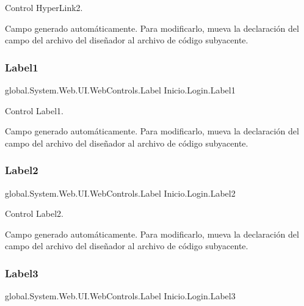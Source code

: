 Control Hyper\+Link2. 

Campo generado automáticamente. Para modificarlo, mueva la declaración del campo del archivo del diseñador al archivo de código subyacente. \mbox{\label{classInicio_1_1Login_a089c50220a66bcedf279557e235b7fb1}} 
\subsubsection{\texorpdfstring{Label1}{Label1}}
{\footnotesize\ttfamily global.\+System.\+Web.\+U\+I.\+Web\+Controls.\+Label Inicio.\+Login.\+Label1\hspace{0.3cm}{\ttfamily [protected]}}



Control Label1. 

Campo generado automáticamente. Para modificarlo, mueva la declaración del campo del archivo del diseñador al archivo de código subyacente. \mbox{\label{classInicio_1_1Login_a88ab7f12f1587cb3a0174d4bdc7baa39}} 
\subsubsection{\texorpdfstring{Label2}{Label2}}
{\footnotesize\ttfamily global.\+System.\+Web.\+U\+I.\+Web\+Controls.\+Label Inicio.\+Login.\+Label2\hspace{0.3cm}{\ttfamily [protected]}}



Control Label2. 

Campo generado automáticamente. Para modificarlo, mueva la declaración del campo del archivo del diseñador al archivo de código subyacente. \mbox{\label{classInicio_1_1Login_ad052535d49bad44248dd771596f4a8af}} 
\subsubsection{\texorpdfstring{Label3}{Label3}}
{\footnotesize\ttfamily global.\+System.\+Web.\+U\+I.\+Web\+Controls.\+Label Inicio.\+Login.\+Label3\hspace{0.3cm}{\ttfamily [protected]}}



